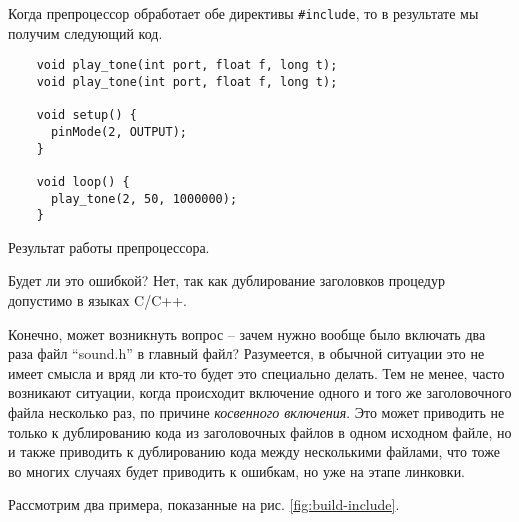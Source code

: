\documentclass[../sparc.tex]{subfiles}
\begin{document}
Когда препроцессор обработает обе директивы \texttt{#include}, то в
результате мы получим следующий код.

\begin{listing}[H]
  \begin{verbatim}
    void play_tone(int port, float f, long t);
    void play_tone(int port, float f, long t);

    void setup() {
      pinMode(2, OUTPUT);
    }

    void loop() {
      play_tone(2, 50, 1000000);
    }
  \end{verbatim}
  \label{listing:game-dev-engine-procedure-header-include-2}
  \caption{Результат работы препроцессора.}
\end{listing}

Будет ли это ошибкой?  Нет, так как дублирование заголовков процедур допустимо в
языках C/C++.

Конечно, может возникнуть вопрос -- зачем нужно вообще было включать два раза
файл ``sound.h'' в главный файл?  Разумеется, в обычной ситуации это не имеет
смысла и вряд ли кто-то будет это специально делать.  Тем не менее, часто
возникают ситуации, когда происходит включение одного и того же заголовочного
файла несколько раз, по причине \emph{косвенного включения}.  Это может
приводить не только к дублированию кода из заголовочных файлов в одном исходном
файле, но и также приводить к дублированию кода между несколькими файлами, что
тоже во многих случаях будет приводить к ошибкам, но уже на этапе линковки.

Рассмотрим два примера, показанные на рис. \ref{fig:build-include}.

\end{document}
